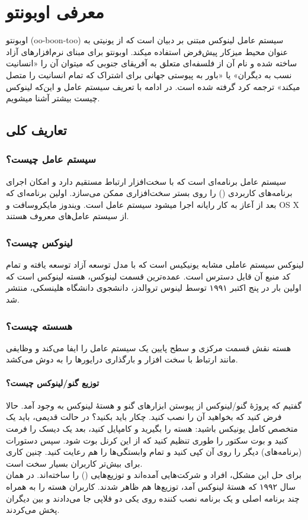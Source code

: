 \chapter{معرفی اوبونتو}
اوبونتو (oo-boon-too) سیستم عامل لینوکس مبتنی بر دبیان است که از یونیتی به عنوان محیط میزکار پیش‌فرض استفاده میکند. اوبونتو برای مبنای نرم‌افزارهای آزاد ساخته شده و نام آن از فلسفه‌ای متعلق به آفریقای جنوبی که میتوان آن را «انسانیت نسب به دیگران» یا «باور به پیوستی جهانی برای اشتراک که تمام انسانیت را متصل میکند» ترجمه کرد گرفته شده است.
در ادامه با تعریف سیستم عامل و این‌که لینوکس چیست بیشتر آشنا میشویم.
\section{تعاریف کلی}
\subsection{سیستم عامل چیست؟}
سیستم عامل برنامه‌ای است که با سخت‌افزار ارتباط مستقیم دارد و امکان اجرای برنامه‌های کاربردی () را روی بستر سخت‌افزاری ممکن می‌سازد.
اولین برنامه‌ای که بعد از آعاز به کار رایانه اجرا میشود سیستم عامل است. ویندوز مایکروسافت و OS X از سیستم عامل‌های معروف هستند.
\subsection{لینوکس چیست؟}
لینوکس سیستم عاملی مشابه یونیکیس است که با مدل توسعه آزاد توسعه یافته و تمام کد منبع آن قابل دسترس است. عمده‌ترین قسمت لینوکس، هسته لینوکس است که اولین بار در پنج اکتبر ۱۹۹۱ توسط لینوس تروالدز، دانشجوی دانشگاه هلینسکی، منتشر شد.
\subsection{هسسته چیست؟}
هسته نقش قسمت مرکزی و سطح پایین یک سیستم عامل را ایفا می‌کند و وظایفی مانند ارتباط با سخت افزار و بارگذاری درایورها را به دوش می‌کشد.
\subsubsection{توزیع گنو/لینوکس چیست؟}
گفتیم که پروژهٔ گنو/لینوکس از پیوستن ابزارهای گنو و هستهٔ لینوکس به وجود آمد. حالا فرض کنید که بخواهید آن را نصب کنید. چکار باید بکنید؟ در حالت قدیمی، باید یک متخصص کامل یونیکس باشید: هسته را بگیرید و کامپایل کنید، بعد یک دیسک را فرمت کنید و بوت سکتور را طوری تنظیم کنید که از این کرنل بوت شود. سپس دستورات (برنامه‌های) دیگر را روی آن کپی کنید و تمام وابستگی‌ها را هم رعایت کنید. چنین کاری برای بیش‌تر کاربران بسیار سخت است.\\
برای حل این مشکل، افراد و شرکت‌هایی آمده‌اند و توزیع‌هایی () را ساخته‌اند. در همان سال ۱۹۹۲ که هستهٔ لینوکس آمد، توزیع‌ها هم ظاهر شدند. کاربران هسته را به همراه چند برنامه اصلی و یک برنامه نصب کننده روی یکی دو فلاپی جا می‌دادند و بین دیگران پخش می‌کردند.
